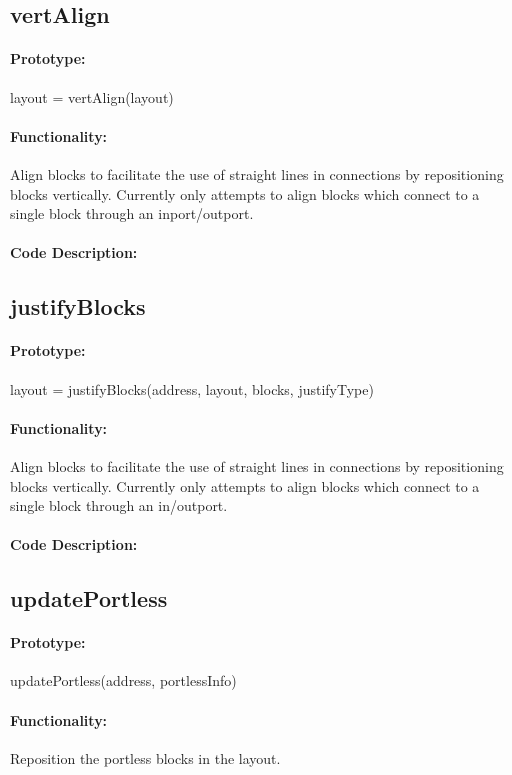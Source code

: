 \documentclass[12pt,letterpaper]{report}
\begin{document}
\subsection{vertAlign}
\paragraph{Prototype:} layout = vertAlign(layout)
\paragraph{Functionality:} Align blocks to facilitate the use of straight lines in connections by repositioning blocks vertically. Currently only attempts to align blocks which connect to a single block through an inport/outport.
\paragraph{Code Description:}

\subsection{justifyBlocks}
\paragraph{Prototype:} layout = justifyBlocks(address, layout, blocks, justifyType)
\paragraph{Functionality:} Align blocks to facilitate the use of straight lines in connections by repositioning blocks vertically. Currently only attempts to align blocks which connect to a single block through an in/outport.
\paragraph{Code Description:}

\subsection{updatePortless}
\paragraph{Prototype:} updatePortless(address, portlessInfo)
\paragraph{Functionality:} Reposition the portless blocks in the layout.
\end{document}

